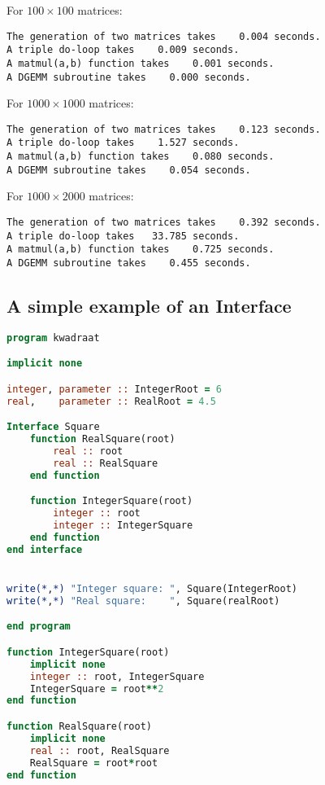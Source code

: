 For $100\times100$ matrices:
\begin{verbatim}
The generation of two matrices takes    0.004 seconds.
A triple do-loop takes    0.009 seconds.
A matmul(a,b) function takes    0.001 seconds.
A DGEMM subroutine takes    0.000 seconds.
\end{verbatim}

For $1000\times1000$ matrices:
\begin{verbatim}
The generation of two matrices takes    0.123 seconds.
A triple do-loop takes    1.527 seconds.
A matmul(a,b) function takes    0.080 seconds.
A DGEMM subroutine takes    0.054 seconds.
\end{verbatim}

For $1000\times2000$ matrices:
\begin{verbatim}
The generation of two matrices takes    0.392 seconds.
A triple do-loop takes   33.785 seconds.
A matmul(a,b) function takes    0.725 seconds.
A DGEMM subroutine takes    0.455 seconds.
\end{verbatim}


\subsection{A simple example of an Interface}

\begin{lstlisting}[language=Fortran]
program kwadraat

implicit none

integer, parameter :: IntegerRoot = 6
real,    parameter :: RealRoot = 4.5

Interface Square  
    function RealSquare(root)
        real :: root
        real :: RealSquare
    end function

    function IntegerSquare(root)
        integer :: root
        integer :: IntegerSquare
    end function
end interface


write(*,*) "Integer square: ", Square(IntegerRoot)
write(*,*) "Real square:    ", Square(realRoot)

end program

function IntegerSquare(root)
    implicit none
    integer :: root, IntegerSquare
    IntegerSquare = root**2
end function

function RealSquare(root)
    implicit none
    real :: root, RealSquare
    RealSquare = root*root
end function
\end{lstlisting}
